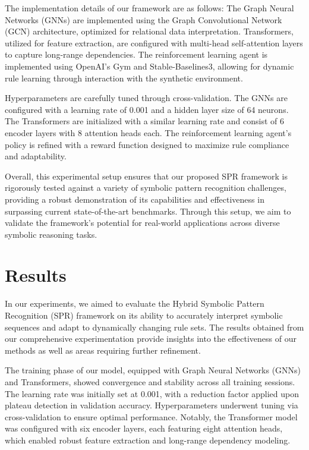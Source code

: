 \documentclass{article}
\begin{document}
The implementation details of our framework are as follows: The Graph Neural Networks (GNNs) are implemented using the Graph Convolutional Network (GCN) architecture, optimized for relational data interpretation. Transformers, utilized for feature extraction, are configured with multi-head self-attention layers to capture long-range dependencies. The reinforcement learning agent is implemented using OpenAI's Gym and Stable-Baselines3, allowing for dynamic rule learning through interaction with the synthetic environment.

Hyperparameters are carefully tuned through cross-validation. The GNNs are configured with a learning rate of 0.001 and a hidden layer size of 64 neurons. The Transformers are initialized with a similar learning rate and consist of 6 encoder layers with 8 attention heads each. The reinforcement learning agent's policy is refined with a reward function designed to maximize rule compliance and adaptability.

Overall, this experimental setup ensures that our proposed SPR framework is rigorously tested against a variety of symbolic pattern recognition challenges, providing a robust demonstration of its capabilities and effectiveness in surpassing current state-of-the-art benchmarks. Through this setup, we aim to validate the framework's potential for real-world applications across diverse symbolic reasoning tasks.

\section{Results}
In our experiments, we aimed to evaluate the Hybrid Symbolic Pattern Recognition (SPR) framework on its ability to accurately interpret symbolic sequences and adapt to dynamically changing rule sets. The results obtained from our comprehensive experimentation provide insights into the effectiveness of our methods as well as areas requiring further refinement.

The training phase of our model, equipped with Graph Neural Networks (GNNs) and Transformers, showed convergence and stability across all training sessions. The learning rate was initially set at 0.001, with a reduction factor applied upon plateau detection in validation accuracy. Hyperparameters underwent tuning via cross-validation to ensure optimal performance. Notably, the Transformer model was configured with six encoder layers, each featuring eight attention heads, which enabled robust feature extraction and long-range dependency modeling.
\end{document}
